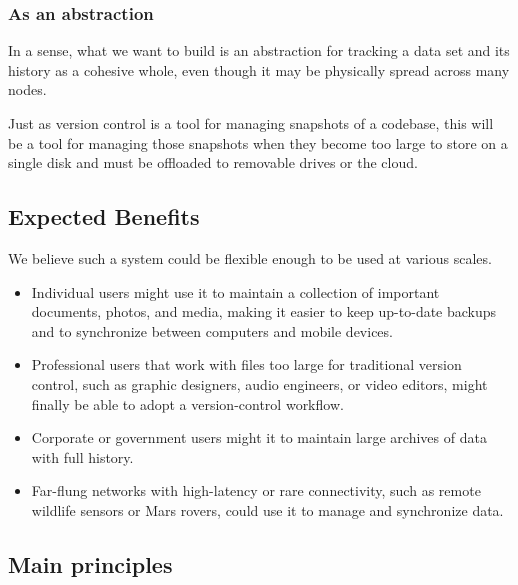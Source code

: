 \documentclass[a4paper]{article}
\begin{document}
\subsubsection{As an abstraction}

In a sense, what we want to build is an abstraction for tracking a data set and
its history as a cohesive whole, even though it may be physically spread across
many nodes.

Just as version control is a tool for managing snapshots of a codebase, this
will be a tool for managing those snapshots when they become too large to store
on a single disk and must be offloaded to removable drives or the cloud.


\subsection{Expected Benefits}

We believe such a system could be flexible enough to be used at various scales.

\begin{itemize}

  \item Individual users might use it to maintain a collection of important
    documents, photos, and media, making it easier to keep up-to-date backups
    and to synchronize between computers and mobile devices.

  \item Professional users that work with files too large for traditional
    version control, such as graphic designers, audio engineers, or video
    editors, might finally be able to adopt a version-control workflow.

  \item Corporate or government users might it to maintain large archives of
    data with full history.

  \item Far-flung networks with high-latency or rare connectivity, such as
    remote wildlife sensors or Mars rovers, could use it to manage and
    synchronize data.

\end{itemize}


\subsection{Main principles}
\end{document}
